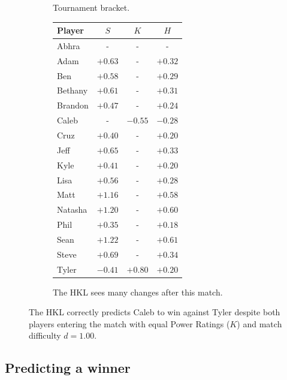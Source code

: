 \documentclass[letterpaper, 10 pt, conference]{ieeeconf}  %
\begin{document}
\begin{figure}
\begin{subfigure}[ht]{0.5\textwidth}
                \caption{Tournament bracket.}
        \end{subfigure}
        \begin{subfigure}[hb]{0.4\textwidth}
                \footnotesize
                \centering
                \begin{tabular}{lccc}
                        Player	&	$S$	&	$K$	&	$H$	\\
                        \midrule							
                        Abhra	&	-	&	-	&	-	\\
                        Adam	&	$+0.63$	&	-	&	$+0.32$	\\
                        Ben	&	$+0.58$	&	-	&	$+0.29$	\\
                        Bethany	&	$+0.61$	&	-	&	$+0.31$	\\
                        Brandon	&	$+0.47$	&	-	&	$+0.24$	\\
                        Caleb	&	-	&	$-0.55$	&	$-0.28$	\\
                        Cruz	&	$+0.40$	&	-	&	$+0.20$	\\
                        Jeff	&	$+0.65$	&	-	&	$+0.33$	\\
                        Kyle	&	$+0.41$	&	-	&	$+0.20$	\\
                        Lisa	&	$+0.56$	&	-	&	$+0.28$	\\
                        Matt	&	$+1.16$	&	-	&	$+0.58$	\\
                        Natasha	&	$+1.20$	&	-	&	$+0.60$	\\
                        Phil	&	$+0.35$	&	-	&	$+0.18$	\\
                        Sean	&	$+1.22$	&	-	&	$+0.61$	\\
                        Steve	&	$+0.69$	&	-	&	$+0.34$	\\
                        Tyler	&	$-0.41$	&	$+0.80$	&	$+0.20$	\\
                \end{tabular}
                \caption{The HKL sees many changes after this match.}
        \end{subfigure}
        \caption{The HKL correctly predicts Caleb to win against Tyler despite both players entering 
                 the match with equal Power Ratings ($K$) and match difficulty $d=1.00$.}
\end{figure}

\clearpage
\subsection{Predicting a winner}
\end{document}
